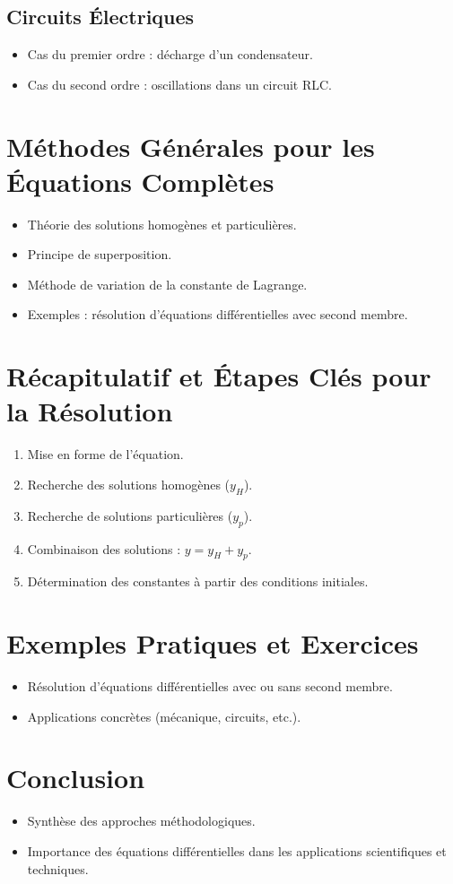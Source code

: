 \subsection{Circuits Électriques}
\begin{itemize}
    \item Cas du premier ordre : décharge d’un condensateur.
    \item Cas du second ordre : oscillations dans un circuit RLC.
\end{itemize}

\section{Méthodes Générales pour les Équations Complètes}
\begin{itemize}
    \item Théorie des solutions homogènes et particulières.
    \item Principe de superposition.
    \item Méthode de variation de la constante de Lagrange.
    \item Exemples : résolution d’équations différentielles avec second membre.
\end{itemize}

\section{Récapitulatif et Étapes Clés pour la Résolution}
\begin{enumerate}
    \item Mise en forme de l’équation.
    \item Recherche des solutions homogènes (\( y_H \)).
    \item Recherche de solutions particulières (\( y_p \)).
    \item Combinaison des solutions : \( y = y_H + y_p \).
    \item Détermination des constantes à partir des conditions initiales.
\end{enumerate}

\section{Exemples Pratiques et Exercices}
\begin{itemize}
    \item Résolution d’équations différentielles avec ou sans second membre.
    \item Applications concrètes (mécanique, circuits, etc.).
\end{itemize}

\section*{Conclusion}
\begin{itemize}
    \item Synthèse des approches méthodologiques.
    \item Importance des équations différentielles dans les applications scientifiques et techniques.
\end{itemize}